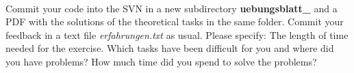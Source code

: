 \\
Commit your code into the SVN in a new subdirectory 
\textbf{uebungsblatt\_\ExerciseSheetNumber} and a PDF with the solutions of the 
theoretical tasks in the same folder. Commit your feedback in a text file 
\emph{erfahrungen.txt} as usual. Please specify: The length of time needed for 
the exercise. Which tasks have been difficult for you and where did you have 
problems? How much time did you spend to solve the problems?